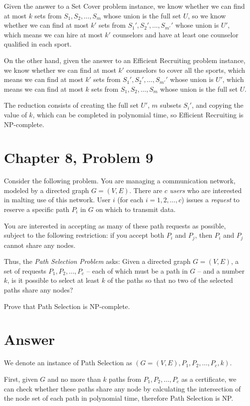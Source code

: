 \documentclass[12pt,letterpaper]{article}
\begin{document}
Given the answer to a Set Cover problem instance, we know whether we can find at most $k$ sets from $S_1, S_2, \dots, S_m$ whose union is the full set $U$, so we know whether we can find at most $k'$ sets from $S_1', S_2', \dots, S_{m'}'$ whose union is $U'$, which means we can hire at most $k'$ counselors and have at least one counselor qualified in each sport.

On the other hand, given the answer to an Efficient Recruiting problem instance, we know whether we can find at most $k'$ counselors to cover all the sports, which means we can find at most $k'$ sets from $S_1', S_2', \dots, S_{m'}'$ whose union is $U'$, which means we can find at most $k$ sets from $S_1, S_2, \dots, S_m$ whose union is the full set $U$.

The reduction consists of creating the full set $U'$, $m$ subsets $S_i'$, and copying the value of $k$, which can be completed in polynomial time, so Efficient Recruiting is NP-complete.

\section*{Chapter 8, Problem 9}
Consider the following problem. You are managing a communication
network, modeled by a directed graph $G = (V, E)$. There are $c$ {\em users} who
are interested in malting use of this network. User $i$ (for each $i = 1, 2, \dots, c$)
issues a {\em request} to reserve a specific path $P_i$ in $G$ on which to transmit
data.

You are interested in accepting as many of these path requests as
possible, subject to the following restriction: if you accept both $P_i$ and $P_j$,
then $P_i$ and $P_j$ cannot share any nodes.

Thus, the {\em Path Selection Problem} asks: Given a directed graph $G =
(V, E)$, a set of requests $P_1, P_2, \dots, P_c$ -- each of which must be a path in
$G$ -- and a number $k$, is it possible to select at least $k$ of the paths so that
no two of the selected paths share any nodes?

Prove that Path Selection is NP-complete.

\section*{Answer}
We denote an instance of Path Selection as $(G=(V,E), P_1, P_2, \dots, P_c, k)$.

First, given $G$ and no more than $k$ paths from $P_1, P_2, \dots, P_c$ as a certificate, we can check whether these paths share any node by calculating the intersection of the node set of each path in polynomial time, therefore Path Selection is NP.
\end{document}
